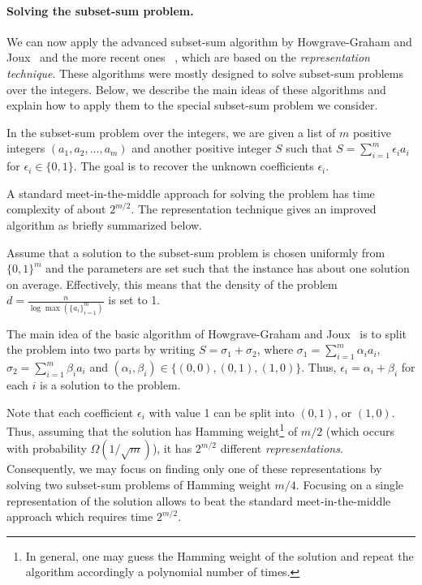 \paragraph{Solving the subset-sum problem.}
We can now apply the advanced subset-sum algorithm by
Howgrave{-}Graham and Joux~\cite{Howgrave-GrahamJ10} and the more recent ones
~\cite{BeckerCJ11,BonnetainBSS20},
which are based on the \emph{representation technique}.
These algorithms were mostly designed to solve subset-sum problems over the integers.
Below, we describe the main ideas of these algorithms
and explain how to apply them to the special subset-sum problem
we consider.

In the subset-sum problem over the integers,
we are given a list of $m$ positive  integers $(a_1,a_2,\ldots,a_m)$
and another positive integer $S$ such that $S = \sum_{i=1}^{m} \epsilon_i a_i$
for $\epsilon_i \in \{0,1\}$. The goal is to recover the unknown coefficients $\epsilon_i$.

A standard meet-in-the-middle approach for solving the problem has time complexity of about $2^{m/2}$.
The representation technique gives an improved algorithm as briefly summarized below.

Assume that a solution to the subset-sum problem is chosen uniformly from $\{0,1\}^m$
and the parameters are set such that the instance has about one solution on average. Effectively, this means that the density of the problem $d = \tfrac{n}{\log \max(\{a_i\}_{i=1}^{m})}$ is set to 1.

The main idea of the basic algorithm of Howgrave{-}Graham and Joux~\cite{Howgrave-GrahamJ10}
is to split the problem into two parts by writing
$S = \sigma_1 + \sigma_2$,
where $\sigma_1 = \sum_{i=1}^{m} \alpha_i a_i$, $\sigma_2 = \sum_{i=1}^{m} \beta_i a_i$
and $(\alpha_i,\beta_i) \in \{(0,0),(0,1),(1,0)\}$.
Thus, $\epsilon_i = \alpha_i + \beta_i$ for each $i$ is a solution to the problem.

Note that each coefficient $\epsilon_i$ with value 1 can be split into $(0,1)$, or $(1,0)$.
Thus, assuming that the solution has Hamming weight\footnote{In general, one
may guess the Hamming weight of the solution and
repeat the algorithm accordingly a polynomial number of times.} of $m/2$
(which occurs with probability $\Omega(1/\sqrt{m})$),
it has $2^{m/2}$ different \emph{representations}.
Consequently, we may focus on finding only one of these representations
by solving two subset-sum problems of Hamming weight $m/4$.
Focusing on a single representation of the solution
allows to beat the standard meet-in-the-middle approach which requires time $2^{m/2}$.

